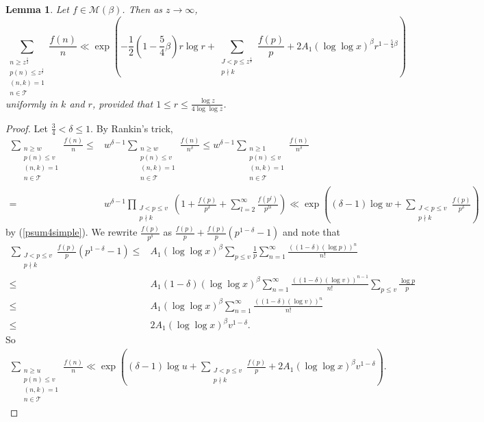 \documentclass{amsart}
\newtheorem{lemma}[theorem]{Lemma}
\begin{document}
\begin{lemma}\label{lemmalogr}
Let $f\in \mathcal M(\beta)$.  Then as $z\to\infty$,
$$\sum_{\substack{n\geq z^\frac 12 \\ p(n)\leq z^\frac 1r \\ (n,k)=1 \\ n\in \mathcal T}}\frac{f(n)}{n}\ll \exp\left(-\frac 12\left(1-\frac{5}{4}\beta\right)r\log r+\sum_{\substack{J<p\leq z^\frac 1r \\ p\nmid k}}\frac{f(p)}{p}+2A_1 (\log\log x)^{\beta}r^{1-\frac{5}{4}\beta}\right)$$
uniformly in $k$ and $r$, provided that $1\leq r\leq \frac{\log z}{4\log\log z}$.
\end{lemma}
\begin{proof}
Let $\frac 34 <\delta\leq 1$.  By Rankin's trick,
\begin{align*}
\sum_{\substack{n\geq w \\ p(n)\leq v \\ (n,k)=1 \\ n\in \mathcal T}}\frac{f(n)}{n}\leq &w^{\delta-1}\sum_{\substack{n\geq w \\ p(n)\leq v \\ (n,k)=1 \\ n\in \mathcal T}}\frac{f(n)}{n^\delta}\leq w^{\delta-1}\sum_{\substack{n\geq 1 \\ p(n)\leq v \\ (n,k)=1 \\ n\in \mathcal T}}\frac{f(n)}{n^\delta}\\
=&w^{\delta-1}\prod_{\substack{J<p\leq v \\ p\nmid k}}\left(1+\frac{f(p)}{p^\delta}+\sum_{l=2}^\infty \frac{f(p^l)}{p^{l\delta}}\right)\ll \exp\left((\delta-1)\log w+\sum_{\substack{J<p\leq v \\ p\nmid k}}\frac{f(p)}{p^\delta}\right)
\end{align*}
by (\ref{psum4simple}).
We rewrite $\frac{f(p)}{p^\delta}$ as $\frac{f(p)}{p}+\frac{f(p)}{p}(p^{1-\delta}-1)$ and note that
\begin{align*}
\sum_{\substack{J<p\leq v \\ p\nmid k}}\frac{f(p)}{p}(p^{1-\delta}-1)\leq &A_1 (\log\log x)^{\beta}\sum_{p\leq v}\frac 1p\sum_{n=1}^\infty \frac{\left((1-\delta)(\log p)\right)^n}{n!}\\
\leq &A_1 (1-\delta)(\log\log x)^{\beta}\sum_{n=1}^\infty \frac{\left((1-\delta)(\log v)\right)^{n-1}}{n!}\sum_{p\leq v}\frac{\log p}p\\
\leq &A_1 (\log\log x)^{\beta}\sum_{n=1}^\infty \frac{\left((1-\delta)(\log v)\right)^{n}}{n!}\\
\leq &2A_1 (\log\log x)^{\beta}v^{1-\delta}.
\end{align*}
So
\begin{align*}
\sum_{\substack{n\geq u \\ p(n)\leq v \\ (n,k)=1 \\ n\in \mathcal T}}\frac{f(n)}{n}\ll \exp\left((\delta-1)\log u+\sum_{\substack{J<p\leq v \\ p\nmid k}}\frac{f(p)}{p}+2A_1 (\log\log x)^{\beta}v^{1-\delta}\right).
\end{align*}




\end{proof}
\end{document}
